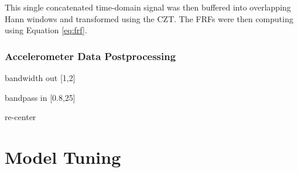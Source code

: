 This single concatenated time-domain signal was then buffered into overlapping Hann windows and transformed using the CZT. The FRFs were then computing using Equation \ref{eq:frf}.

\subsubsection{Accelerometer Data Postprocessing}

bandwidth out [1,2]

bandpass in [0.8,25]

re-center


\section{Model Tuning} %
